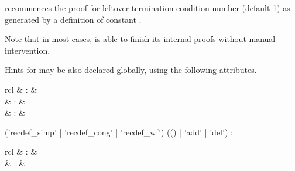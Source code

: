 \begin{isabellebody}
\begin{isamarkuptext}
\begin{descr}
  \item [\hyperlink{command.HOL.recdef-tc}{\mbox{\isa{\isacommand{recdef{\isacharunderscore}tc}}}}~\isa{{\isachardoublequote}c\ {\isacharparenleft}i{\isacharparenright}{\isachardoublequote}}] recommences the
  proof for leftover termination condition number  (default
  1) as generated by a \hyperlink{command.HOL.recdef}{\mbox{}} definition of
  constant .
  
  Note that in most cases, \hyperlink{command.HOL.recdef}{\mbox{}} is able to finish
  its internal proofs without manual intervention.

  \end{descr}

  \medskip Hints for \hyperlink{command.HOL.recdef}{\mbox{}} may be also declared
  globally, using the following attributes.

  \begin{matharray}{rcl}
    \hypertarget{attribute.HOL.recdef-simp}{\hyperlink{attribute.HOL.recdef-simp}{\mbox{}}} & : & \isaratt \\
    \hypertarget{attribute.HOL.recdef-cong}{\hyperlink{attribute.HOL.recdef-cong}{\mbox{}}} & : & \isaratt \\
    \hypertarget{attribute.HOL.recdef-wf}{\hyperlink{attribute.HOL.recdef-wf}{\mbox{}}} & : & \isaratt \\
  \end{matharray}

  \begin{rail}
    ('recdef\_simp' | 'recdef\_cong' | 'recdef\_wf') (() | 'add' | 'del')
    ;
  \end{rail}%
\end{isamarkuptext}%
\isamarkuptrue%
%
\isamarkuptrue%
%
\begin{isamarkuptext}%
\begin{matharray}{rcl}
    \hypertarget{command.HOL.specification}{\hyperlink{command.HOL.specification}{\mbox{}}} & : &  \\
    \hypertarget{command.HOL.ax-specification}{\hyperlink{command.HOL.ax-specification}{\mbox{}}} & : &  \\
  \end{matharray}


\end{isamarkuptext}
\end{isabellebody}
